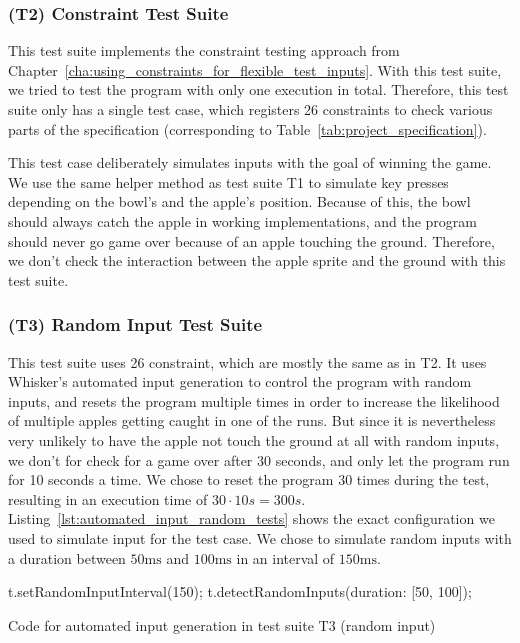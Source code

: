 \subsubsection{(T2) Constraint Test Suite}

This test suite implements the constraint testing approach from Chapter~\ref{cha:using_constraints_for_flexible_test_inputs}.
With this test suite, we tried to test the program with only one execution in total.
Therefore, this test suite only has a single test case, which registers 26 constraints to check various parts of the specification
(corresponding to Table~\ref{tab:project_specification}).
\parspace

This test case deliberately simulates inputs with the goal of winning the game.
We use the same helper method as test suite T1 to simulate key presses depending on the bowl's and the apple's position.
Because of this, the bowl should always catch the apple in working implementations,
and the program should never go game over because of an apple touching the ground.
Therefore, we don't check the interaction between the apple sprite and the ground with this test suite.

\subsubsection{(T3) Random Input Test Suite}

This test suite uses 26 constraint, which are mostly the same as in T2.
It uses Whisker's automated input generation to control the program with random inputs,
and resets the program multiple times in order to increase the likelihood of multiple apples getting caught in one of the runs.
But since it is nevertheless very unlikely to have the apple not touch the ground at all with random inputs,
we don't for check for a game over after 30 seconds, and only let the program run for 10 seconds a time.
We chose to reset the program 30 times during the test, resulting in an execution time of $30 \cdot 10s = 300s$.
Listing~\ref{lst:automated_input_random_tests} shows the exact configuration we used to simulate input for the test case.
We chose to simulate random inputs with a duration between $50\text{ms}$ and $100\text{ms}$ in an interval of $150\text{ms}$.
\parspace

\begin{listing}[htpb]
    \centering
    \begin{minipage}{.55\textwidth}
        \begin{javascriptcode}
            t.setRandomInputInterval(150);
            t.detectRandomInputs({duration: [50, 100]});
        \end{javascriptcode}
    \end{minipage}
    \caption{Code for automated input generation in test suite T3 (random input)}
    \label{lst:automated_input_random_tests}
\end{listing}

